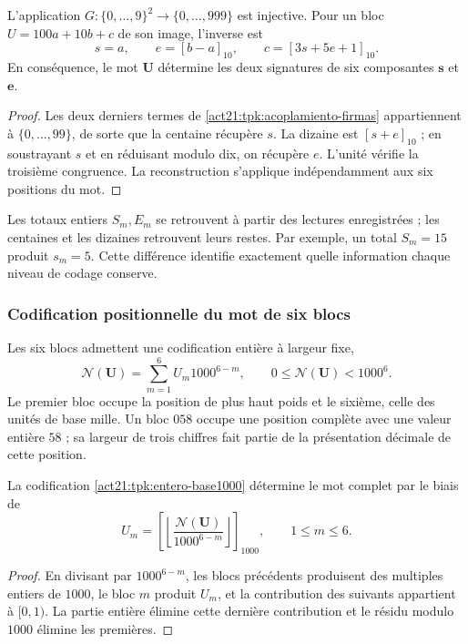 \begin{proposition}
\label{act21:tpk:recuperacion-firmas}
L'application \(G:\{0,\ldots,9\}^2\to\{0,\ldots,999\}\) est injective.
Pour un bloc \(U=100a+10b+c\) de son image, l'inverse est
\[
 s=a,\qquad e=[b-a]_{10},\qquad
 c=[3s+5e+1]_{10}.
\]
En conséquence, le mot \(\mathbf U\) détermine les deux signatures de six composantes \(\mathbf s\) et \(\mathbf e\).
\end{proposition}
\begin{proof}
Les deux derniers termes de \eqref{act21:tpk:acoplamiento-firmas} appartiennent à
\(\{0,\ldots,99\}\), de sorte que la centaine récupère \(s\). La dizaine
est \([s+e]_{10}\) ; en soustrayant \(s\) et en réduisant modulo dix, on récupère
\(e\). L'unité vérifie la troisième congruence. La reconstruction s'applique
indépendamment aux six positions du mot.
\end{proof}

Les totaux entiers \(S_m,E_m\) se retrouvent à partir des lectures enregistrées ;
les centaines et les dizaines retrouvent leurs restes. Par exemple, un total
\(S_m=15\) produit \(s_m=5\). Cette différence identifie exactement
quelle information chaque niveau de codage conserve.



\subsubsection{Codification positionnelle du mot de six blocs}

Les six blocs admettent une codification entière à largeur fixe,
\begin{equation}
 \mathscr N(\mathbf U)=\sum_{m=1}^{6}U_m1000^{6-m},
 \qquad0\leq\mathscr N(\mathbf U)<1000^6.
 \label{act21:tpk:entero-base1000}
\end{equation}
Le premier bloc occupe la position de plus haut poids et le sixième, celle des unités de base mille. Un bloc \(058\) occupe une position complète avec une valeur entière \(58\) ; sa largeur de trois chiffres fait partie de la présentation décimale de cette position.

\begin{proposition}
\label{act21:tpk:inversa-base1000}
La codification \eqref{act21:tpk:entero-base1000} détermine le mot complet
par le biais de
\[
 U_m=\left[\left\lfloor
 \frac{\mathscr N(\mathbf U)}{1000^{6-m}}\right\rfloor\right]_{1000},
 \qquad1\leq m\leq6.
\]
\end{proposition}
\begin{proof}
En divisant par \(1000^{6-m}\), les blocs précédents produisent des multiples entiers de \(1000\), le bloc \(m\) produit \(U_m\), et la contribution des suivants appartient à \([0,1)\). La partie entière élimine cette dernière contribution et le résidu modulo \(1000\) élimine les premières.
\end{proof}

